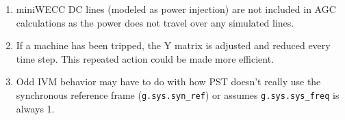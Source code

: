 \begin{enumerate}
	\item miniWECC DC lines (modeled as power injection) are not included in AGC calculations as the power does not travel over any simulated lines.
	\item If a machine has been tripped, the Y matrix is adjusted and reduced every time step. This repeated action could be made more efficient.
	\item Odd IVM behavior may have to do with how PST doesn't really use the synchronous reference frame (\verb|g.sys.syn_ref|) or assumes \verb|g.sys.sys_freq| is always 1.
\end{enumerate}
